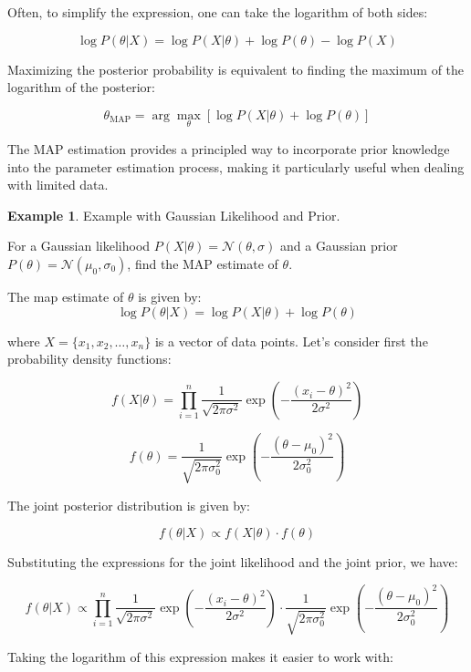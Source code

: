 \documentclass[12pt]{book}
\theoremstyle{definition}
\newtheorem{exmp}{Example}[chapter]
\begin{document}
Often, to simplify the expression, one can take the logarithm of both sides:

\[ \log P(\theta | X) = \log P(X | \theta) + \log P(\theta) - \log P(X) \]


Maximizing the posterior probability is equivalent to finding the maximum of the logarithm of the posterior:

\[ \theta_{\text{MAP}} = \arg \max_\theta \left[ \log P(X | \theta) + \log P(\theta) \right] \]

The MAP estimation provides a principled way to incorporate prior knowledge into the parameter estimation process, making it particularly useful when dealing with limited data.

\begin{tcolorbox}
    
\begin{exmp}{Example with Gaussian Likelihood and Prior.}

For a Gaussian likelihood \(P(X | \theta) = \mathcal{N}(\theta, \sigma)\) and a Gaussian prior \(P(\theta) = \mathcal{N}(\mu_0, \sigma_0)\), find the MAP estimate of $\theta$.

\end{exmp}
\end{tcolorbox}

The map estimate of $\theta$ is given by:
\[ \log P(\theta | X) = \log P(X | \theta) + \log P(\theta)\]

where \( X = \{x_1, x_2, \ldots, x_n\} \) is a vector of data points. Let's consider first the probability density functions: 

   \[ f(X | \theta) = \prod_{i=1}^{n} \frac{1}{\sqrt{2\pi\sigma^2}} \exp\left(-\frac{(x_i - \theta)^2}{2\sigma^2}\right) \]


   \[ f(\theta) = \frac{1}{\sqrt{2\pi\sigma_0^2}} \exp\left(-\frac{(\theta - \mu_0)^2}{2\sigma_0^2}\right)\]


The joint posterior distribution is given by:

\[ f(\theta | X) \propto f(X | \theta) \cdot f(\theta) \]

Substituting the expressions for the joint likelihood and the joint prior, we have:

\[ f(\theta | X) \propto \prod_{i=1}^{n} \frac{1}{\sqrt{2\pi\sigma^2}} \exp\left(-\frac{(x_i - \theta)^2}{2\sigma^2}\right) \cdot \frac{1}{\sqrt{2\pi\sigma_0^2}} \exp\left(-\frac{(\theta - \mu_0)^2}{2\sigma_0^2}\right) \]

Taking the logarithm of this expression makes it easier to work with:
\end{document}

